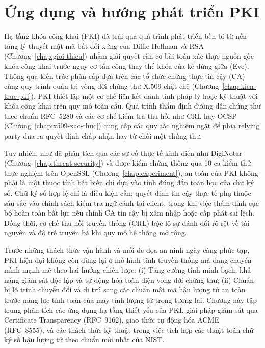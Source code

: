 \chapter{Ứng dụng và hướng phát triển PKI}
\label{chap:ung-dung}

Hạ tầng khóa công khai (PKI) đã trải qua quá trình phát triển bền bỉ từ nền tảng lý thuyết mật mã bất đối xứng của Diffie-Hellman và RSA (Chương~\ref{chap:gioi-thieu}) nhằm giải quyết căn cơ bài toán xác thực nguồn gốc khóa công khai trước nguy cơ tấn công thay thế khóa của kẻ đứng giữa (Eve). Thông qua kiến trúc phân cấp dựa trên các tổ chức chứng thực tin cậy (CA) cùng quy trình quản trị vòng đời chứng thư X.509 chặt chẽ (Chương~\ref{chap:kien-truc-pki}), PKI thiết lập một cơ chế liên kết danh tính pháp lý hoặc kỹ thuật với khóa công khai trên quy mô toàn cầu. Quá trình thẩm định đường dẫn chứng thư theo chuẩn RFC~5280 và các cơ chế kiểm tra thu hồi như CRL hay OCSP (Chương~\ref{chap:x509-xac-thuc}) cung cấp các quy tắc nghiêm ngặt để phía relying party đưa ra quyết định chấp nhận hay từ chối một chứng thư.

Tuy nhiên, như đã phân tích qua các sự cố thực tế kinh điển như DigiNotar (Chương~\ref{chap:threat-security}) và được kiểm chứng thông qua 10 ca kiểm thử thực nghiệm trên OpenSSL (Chương~\ref{chap:experiment}), an toàn của PKI không phải là một thuộc tính bất biến chỉ dựa vào tính đúng đắn toán học của chữ ký số. Chữ ký số hợp lệ chỉ là điều kiện cần; quyết định tin cậy thực tế phụ thuộc sâu sắc vào chính sách kiểm tra ngữ cảnh tại client, trong khi việc thẩm định cục bộ hoàn toàn bất lực nếu chính CA tin cậy bị xâm nhập hoặc cấp phát sai lệch. Đồng thời, cơ chế thu hồi truyền thống (CRL) bộc lộ sự đánh đổi rõ rệt về tài nguyên và độ trễ truyền bá khi quy mô hệ thống mở rộng.

Trước những thách thức vận hành và mối đe dọa an ninh ngày càng phức tạp, PKI hiện đại không còn dừng lại ở mô hình tĩnh truyền thống mà đang chuyển mình mạnh mẽ theo hai hướng chiến lược: (i) Tăng cường tính minh bạch, khả năng giám sát độc lập và tự động hóa toàn diện vòng đời chứng thư; (ii) Chuẩn bị lộ trình chuyển đổi và di trú sang các chuẩn mật mã hậu lượng tử an toàn trước năng lực tính toán của máy tính lượng tử trong tương lai. Chương này tập trung phân tích các ứng dụng hạ tầng thiết yếu của PKI, giải pháp giám sát qua Certificate Transparency (RFC~9162), giao thức tự động hóa ACME (RFC~8555), và các thách thức kỹ thuật trong việc tích hợp các thuật toán chữ ký số hậu lượng tử theo chuẩn mới nhất của NIST.

